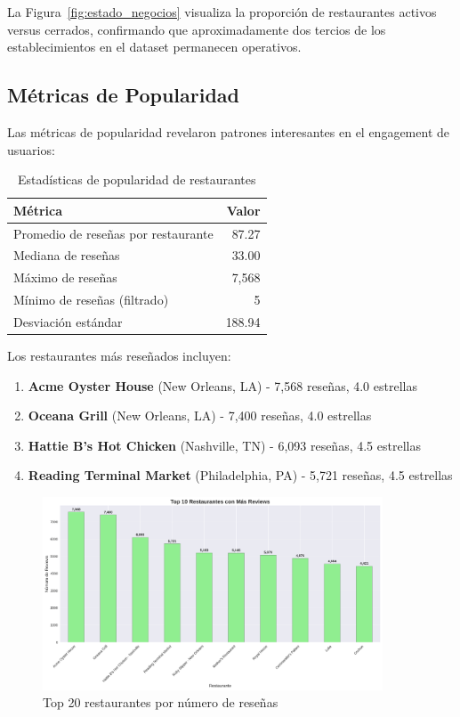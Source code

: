 \documentclass[12pt,a4paper,twoside,openany]{book}
\begin{document}
La Figura~\ref{fig:estado_negocios} visualiza la proporción de restaurantes activos versus cerrados, confirmando que aproximadamente dos tercios de los establecimientos en el dataset permanecen operativos.

\subsection{Métricas de Popularidad}

Las métricas de popularidad revelaron patrones interesantes en el engagement de usuarios:

\begin{table}[H]
\centering
\caption{Estadísticas de popularidad de restaurantes}
\begin{tabular}{@{}lr@{}}
\toprule
\textbf{Métrica} & \textbf{Valor} \\
\midrule
Promedio de reseñas por restaurante & 87.27 \\
Mediana de reseñas & 33.00 \\
Máximo de reseñas & 7,568 \\
Mínimo de reseñas (filtrado) & 5 \\
Desviación estándar & 188.94 \\
\bottomrule
\end{tabular}
\end{table}

Los restaurantes más reseñados incluyen:
\begin{enumerate}
    \item \textbf{Acme Oyster House} (New Orleans, LA) - 7,568 reseñas, 4.0 estrellas
    \item \textbf{Oceana Grill} (New Orleans, LA) - 7,400 reseñas, 4.0 estrellas
    \item \textbf{Hattie B's Hot Chicken} (Nashville, TN) - 6,093 reseñas, 4.5 estrellas
    \item \textbf{Reading Terminal Market} (Philadelphia, PA) - 5,721 reseñas, 4.5 estrellas
\end{enumerate}

\begin{figure}[H]
\centering
\includegraphics[width=0.9\textwidth]{figures/business_top_restaurants_by_reviews.png}
\caption{Top 20 restaurantes por número de reseñas}
\label{fig:business_top_restaurants}
\end{figure}
\end{document}

